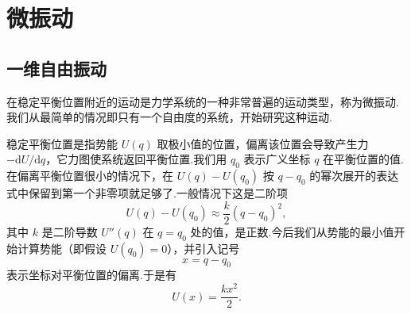 \chapter{微振动}

\section{一维自由振动}

在稳定平衡位置附近的运动是力学系统的一种非常普遍的运动类型，称为微振动.我们从最简单的情况即只有一个自由度的系统，开始研究这种运动.

稳定平衡位置是指势能 $U(q)$ 取极小值的位置，偏离该位置会导致产生力 $-\mathrm{d}U/\mathrm{d}q$，它力图使系统返回平衡位置.我们用 $q_0$ 表示广义坐标 $q$ 在平衡位置的值.在偏离平衡位置很小的情况下，在 $U(q)-U(q_0)$ 按 $q-q_0$ 的幂次展开的表达式中保留到第一个非零项就足够了.一般情况下这是二阶项
\begin{equation*}
  U(q)-U(q_0)\approx\frac{k}{2}\left(q-q_0\right)^2,
\end{equation*}
其中 $k$ 是二阶导数 $U''(q)$ 在 $q=q_0$ 处的值，是正数.今后我们从势能的最小值开始计算势能（即假设 $U(q_0)=0$），并引入记号
\begin{equation}
  x=q-q_0
\end{equation}
表示坐标对平衡位置的偏离.于是有
\begin{equation}
  U(x)=\frac{kx^2}{2}.
\end{equation}

